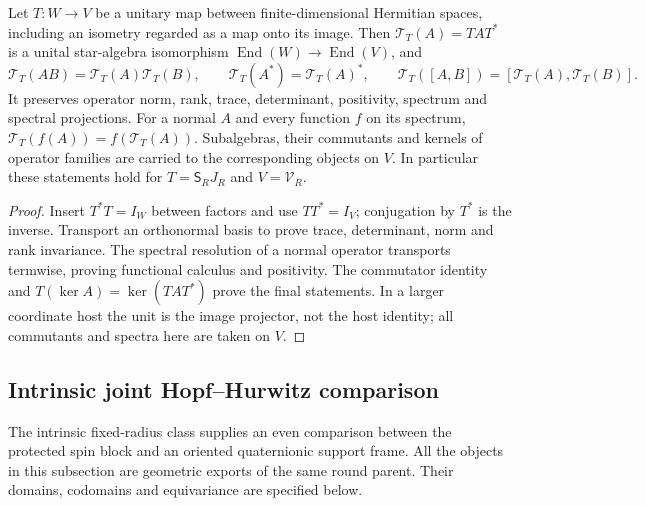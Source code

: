 \documentclass[11pt]{article}
\begin{document}
\begin{theorem}
\label{p1:thm:v204-isometric-algebra-transport}
Let $T:W\to V$ be a unitary map between finite-dimensional Hermitian
spaces, including an isometry regarded as a map onto its image. Then
$\mathcal T_T(A)=TAT^*$ is a unital star-algebra isomorphism
$\operatorname{End}(W)\to\operatorname{End}(V)$, and
\[
 \mathcal T_T(AB)=\mathcal T_T(A)\mathcal T_T(B),\qquad
 \mathcal T_T(A^*)=\mathcal T_T(A)^*,\qquad
 \mathcal T_T([A,B])=[\mathcal T_T(A),\mathcal T_T(B)].
\]
It preserves operator norm, rank, trace, determinant, positivity, spectrum
and spectral projections. For a normal $A$ and every function $f$ on its
spectrum, $\mathcal T_T(f(A))=f(\mathcal T_T(A))$.
Subalgebras, their commutants and kernels of operator families are carried
to the corresponding objects on $V$. In particular these statements hold
for $T=\mathsf S_RJ_R$ and $V=\mathcal V_R$.
\end{theorem}
\begin{proof}
Insert $T^*T=I_W$ between factors and use $TT^*=I_V$; conjugation by $T^*$
is the inverse. Transport an orthonormal basis to prove trace, determinant,
norm and rank invariance. The spectral resolution of a normal operator
transports termwise, proving functional calculus and positivity. The
commutator identity and $T(\ker A)=\ker(TAT^*)$ prove the final statements.
In a larger coordinate host the unit is the image projector, not the host
identity; all commutants and spectra here are taken on $V$.
\end{proof}


\subsection{Intrinsic joint Hopf--Hurwitz comparison}

The intrinsic fixed-radius class supplies an even comparison between the
protected spin block and an oriented quaternionic support frame.  All the
objects in this subsection are geometric exports of the same round parent.
Their domains, codomains and equivariance are specified below.
\end{document}
